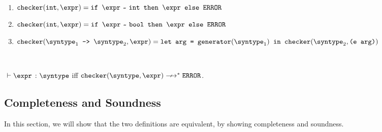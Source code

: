 \begin{definition}
  \label{def_checkCore}
  \ \par
  \begin{enumerate}
      \item $\mkche{\tint}{\expr} = \ife{\matches{\expr}{\tint}}{\expr}{\eerror}$
      \item $\mkche{\tint}{\expr} = \ife{\matches{\expr}{\tbool}}{\expr}{\eerror}$
      \item $\mkche{\mkfun{\syntype_1}{\syntype_2}}{\expr} = \\
       \texttt{let arg = }\mkgen{\syntype_1} \texttt{ in }\mkche{\syntype_2}{\texttt{(e arg)}}$
   \end{enumerate}
\end{definition}

\begin{definition}
  \ \par
  $\ \vdash \hastype{\expr}{\syntype}$ iff $\mkche{\syntype}{\expr} \nsmallsteps[] \eerror$.
\end{definition}

\subsection{Completeness and Soundness}

In this section, we will show that the two definitions are equivalent, by showing
completeness and soundness.

